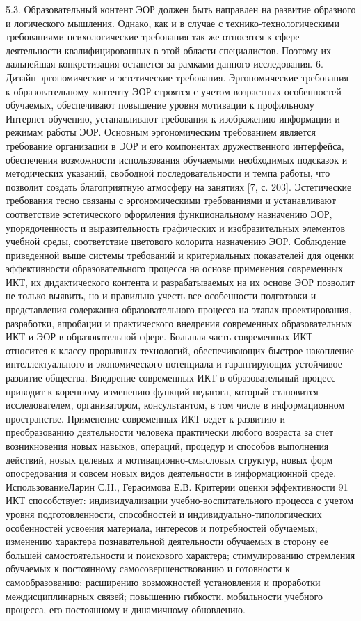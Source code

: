 5.3. Образовательный контент ЭОР должен быть направлен на развитие
образного и логического мышления.
Однако, как и в случае с технико-технологическими требованиями психологические требования так же относятся к сфере деятельности квалифицированных в этой области специалистов. Поэтому их дальнейшая конкретизация останется за рамками данного исследования.
6. Дизайн-эргономические и эстетические требования.
Эргономические требования к образовательному контенту ЭОР строятся с учетом возрастных особенностей обучаемых, обеспечивают повышение
уровня мотивации к профильному Интернет-обучению, устанавливают требования к изображению информации и режимам работы ЭОР. Основным
эргономическим требованием является требование организации в ЭОР и его
компонентах дружественного интерфейса, обеспечения возможности использования обучаемыми необходимых подсказок и методических указаний,
свободной последовательности и темпа работы, что позволит создать благоприятную атмосферу на занятиях [7, с. 203].
Эстетические требования тесно связаны с эргономическими требованиями и устанавливают соответствие эстетического оформления функциональному назначению ЭОР, упорядоченность и выразительность графических и изобразительных элементов учебной среды, соответствие цветового
колорита назначению ЭОР.
Соблюдение приведенной выше системы требований и критериальных
показателей для оценки эффективности образовательного процесса на основе
применения современных ИКТ, их дидактического контента и разрабатываемых на их основе ЭОР позволит не только выявить, но и правильно учесть все
особенности подготовки и представления содержания образовательного процесса на этапах проектирования, разработки, апробации и практического внедрения современных образовательных ИКТ и ЭОР в образовательной сфере.
Большая часть современных ИКТ относится к классу прорывных технологий, обеспечивающих быстрое накопление интеллектуального и экономического потенциала и гарантирующих устойчивое развитие общества.
Внедрение современных ИКТ в образовательный процесс приводит к коренному изменению функций педагога, который становится исследователем, организатором, консультантом, в том числе в информационном пространстве.
Применение современных ИКТ ведет к развитию и преобразованию деятельности человека практически любого возраста за счет возникновения новых
навыков, операций, процедур и способов выполнения действий, новых целевых и мотивационно-смысловых структур, новых форм опосредования и
совсем новых видов деятельности в информационной среде. ИспользованиеЛарин С.Н., Герасимова Е.В. Критерии оценки эффективности
91
ИКТ способствует: индивидуализации учебно-воспитательного процесса с
учетом уровня подготовленности, способностей и индивидуально-типологических особенностей усвоения материала, интересов и потребностей обучаемых; изменению характера познавательной деятельности обучаемых в
сторону ее большей самостоятельности и поискового характера; стимулированию стремления обучаемых к постоянному самосовершенствованию и
готовности к самообразованию; расширению возможностей установления и
проработки междисциплинарных связей; повышению гибкости, мобильности учебного процесса, его постоянному и динамичному обновлению.